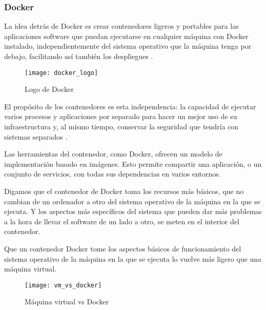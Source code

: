 \subsubsection{Docker}

La idea detrás de Docker es crear contenedores ligeros y portables para las aplicaciones software que puedan ejecutarse en cualquier máquina con Docker instalado, independientemente del sistema operativo que la máquina tenga por debajo, facilitando así también los despliegues \cite{docker4}.

\begin{figure}[htp!]
  \centering
  \texttt{[image: docker\_logo]}
  \caption{Logo de Docker}
  \label{fig:docker_logo}
\end{figure}

El propósito de los contenedores es esta independencia: la capacidad de ejecutar varios procesos y aplicaciones por separado para hacer un mejor uso de su infraestructura y, al mismo tiempo, conservar la seguridad que tendría con sistemas separados \cite{docker5}.

Las herramientas del contenedor, como Docker, ofrecen un modelo de implementación basado en imágenes. Esto permite compartir una aplicación, o un conjunto de servicios, con todas sus dependencias en varios entornos.

Digamos que el contenedor de Docker toma los recursos más básicos, que no cambian de un ordenador a otro del sistema operativo de la máquina en la que se ejecuta. Y los aspectos más específicos del sistema que pueden dar más problemas a la hora de llevar el software de un lado a otro, se meten en el interior del contenedor.

Que un contenedor Docker tome los aspectos básicos de funcionamiento del sistema operativo de la máquina en la que se ejecuta lo vuelve más ligero que una máquina virtual.

\begin{figure}[htp!]
  \centering
  \texttt{[image: vm\_vs\_docker]}
  \caption{Máquina virtual vs Docker}
  \label{fig:vm_vs_docker}
\end{figure}
